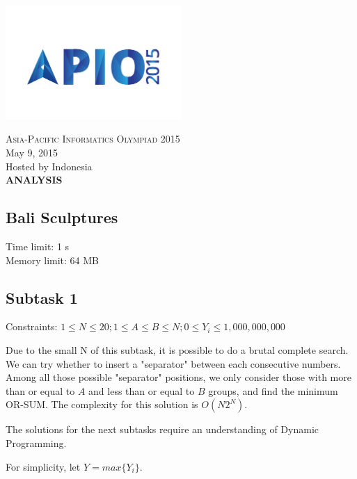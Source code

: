 \documentclass[a4paper]{article}
\begin{document}
\begin{titlepage}
\begin{center}
	\includegraphics[width=0.5\textwidth]{apio2015}
	
	\textsc{\huge Asia-Pacific Informatics Olympiad 2015}\\[0.5cm]
	
	\LARGE May 9, 2015\\[0.25cm]
    \LARGE Hosted by Indonesia\\[3cm]
    
    \LARGE \bfseries ANALYSIS\\[0.5cm]
	
\end{center}
\end{titlepage}

\begin{center}
	\section*{Bali Sculptures}
	Time limit: 1 s\\
	Memory limit: 64 MB
\end{center}

\subsection*{Subtask 1}
Constraints: $1\leq N \leq 20; 1 \leq A \leq B \leq N; 0 \leq Y_i \leq 1,000,000,000$

Due to the small N of this subtask, it is possible to do a brutal complete search. We can try whether to insert a "separator" between each consecutive numbers. Among all those possible "separator" positions, we only consider those with more than or equal to $A$ and less than or equal to $B$ groups, and find the minimum OR-SUM. The complexity for this solution is $O(N2^N)$.

The solutions for the next subtasks require an understanding of Dynamic Programming.

For simplicity, let $Y = max\{Y_i\}$.
\end{document}
